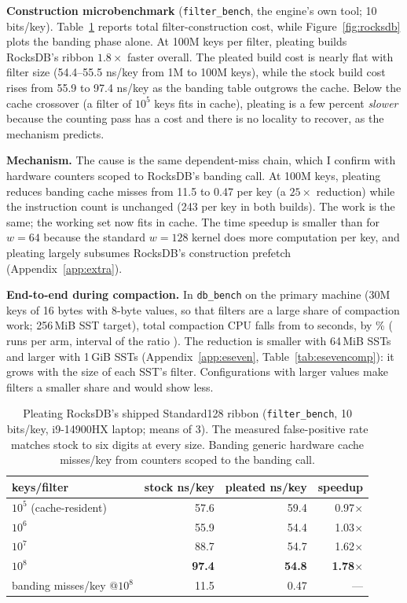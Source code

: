 \documentclass{article}
\begin{document}
\textbf{Construction microbenchmark} (\texttt{filter\_bench}, the engine's own tool; 10 bits/key).
Table~\ref{tab:rocksdb} reports total filter-construction cost, while Figure~\ref{fig:rocksdb}
plots the banding phase alone. At 100M keys per filter, pleating builds RocksDB's ribbon
$1.8\times$ faster overall. The pleated build cost is nearly flat with filter size (54.4--55.5 ns/key
from 1M to 100M keys), while the stock build cost rises from 55.9 to
97.4 ns/key as the banding table outgrows the cache. Below the cache crossover (a filter of $10^5$ keys
fits in cache), pleating is a few percent \emph{slower} because the counting pass has a cost and
there is no locality to recover, as the mechanism predicts.

\textbf{Mechanism.} The cause is the same dependent-miss chain, which I confirm with hardware
counters scoped to RocksDB's banding call. At 100M keys, pleating reduces banding cache misses from
11.5 to 0.47 per key (a $25\times$ reduction) while the instruction count is unchanged (243 per
key in both builds). The work is the same; the working set now fits
in cache. The time speedup is smaller than for $w=64$ because the standard $w=128$ kernel does more computation per key, and pleating largely subsumes RocksDB's construction prefetch (Appendix~\ref{app:extra}).

\textbf{End-to-end during compaction.} In \texttt{db\_bench} on the primary machine (30M keys
of 16 bytes with 8-byte values, so that filters are a large share of compaction work; 256\,MiB
SST target), total compaction CPU falls from \esevencompstock{} to \esevencomppleated{} seconds,
by \esevencompreduction\% (\esevencompreps{} runs per arm, interval of the ratio
\esevencompci). The reduction is smaller with 64\,MiB SSTs and larger with 1\,GiB SSTs
(Appendix~\ref{app:eseven}, Table~\ref{tab:esevencomp}): it grows with the size of each SST's
filter. Configurations with larger values make filters a smaller share and would show less.

\begin{table}
\caption{Pleating RocksDB's shipped Standard128 ribbon (\texttt{filter\_bench}, 10 bits/key,
 i9-14900HX laptop; means of 3). The measured false-positive rate matches stock to six digits at every size.
Banding generic hardware cache misses/key from counters scoped to the banding call.}
\label{tab:rocksdb}
\begin{tabular}{lrrr}
\toprule
keys/filter & stock ns/key & pleated ns/key & speedup \\
\midrule
$10^5$ (cache-resident) & 57.6 & 59.4 & 0.97$\times$ \\
$10^6$                  & 55.9 & 54.4 & 1.03$\times$ \\
$10^7$                  & 88.7 & 54.7 & 1.62$\times$ \\
$10^8$                  & \textbf{97.4} & \textbf{54.8} & \textbf{1.78$\times$} \\
\midrule
banding misses/key @$10^8$ & 11.5 & 0.47 & --- \\
\bottomrule
\end{tabular}
\end{table}
\end{document}
